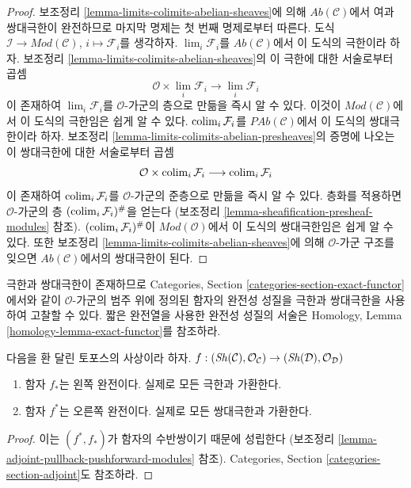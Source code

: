 \begin{proof}
보조정리 \ref{lemma-limits-colimits-abelian-sheaves}에 의해
$\textit{Ab}(\mathcal{C})$에서 여과 쌍대극한이 완전하므로 마지막 명제는
첫 번째 명제로부터 따른다. 도식
$\mathcal{I} \to \textit{Mod}(\mathcal{C})$, $i \mapsto \mathcal{F}_i$를
생각하자. $\lim_i \mathcal{F}_i$를 $\textit{Ab}(\mathcal{C})$에서 이
도식의 극한이라 하자. 보조정리
\ref{lemma-limits-colimits-abelian-sheaves}의 이 극한에 대한 서술로부터
곱셈
$$
\mathcal{O} \times \lim_i \mathcal{F}_i
\longrightarrow
\lim_i \mathcal{F}_i
$$
이 존재하여 $\lim_i \mathcal{F}_i$를 $\mathcal{O}$-가군의 층으로
만듦을 즉시 알 수 있다. 이것이 $\textit{Mod}(\mathcal{C})$에서 이
도식의 극한임은 쉽게 알 수 있다. $\mathop{\mathrm{colim}}\nolimits_i \mathcal{F}_i$를
$\textit{PAb}(\mathcal{C})$에서 이 도식의 쌍대극한이라 하자.
보조정리 \ref{lemma-limits-colimits-abelian-presheaves}의 증명에 나오는
이 쌍대극한에 대한 서술로부터 곱셈
$$
\mathcal{O} \times \mathop{\mathrm{colim}}\nolimits_i \mathcal{F}_i
\longrightarrow
\mathop{\mathrm{colim}}\nolimits_i \mathcal{F}_i
$$
이 존재하여 $\mathop{\mathrm{colim}}\nolimits_i \mathcal{F}_i$를 $\mathcal{O}$-가군의 준층으로
만듦을 즉시 알 수 있다. 층화를 적용하면 $\mathcal{O}$-가군의 층
$(\mathop{\mathrm{colim}}\nolimits_i \mathcal{F}_i)^\#$을 얻는다
(보조정리 \ref{lemma-sheafification-presheaf-modules} 참조).
$(\mathop{\mathrm{colim}}\nolimits_i \mathcal{F}_i)^\#$이 $\textit{Mod}(\mathcal{O})$에서 이
도식의 쌍대극한임은 쉽게 알 수 있다. 또한 보조정리
\ref{lemma-limits-colimits-abelian-sheaves}에 의해
$\mathcal{O}$-가군 구조를 잊으면 $\textit{Ab}(\mathcal{C})$에서의
쌍대극한이 된다.
\end{proof}

\noindent
극한과 쌍대극한이 존재하므로 Categories, Section
\ref{categories-section-exact-functor}에서와 같이 $\mathcal{O}$-가군의
범주 위에 정의된 함자의 완전성 성질을 극한과 쌍대극한을 사용하여
고찰할 수 있다. 짧은 완전열을 사용한 완전성 성질의 서술은
Homology, Lemma \ref{homology-lemma-exact-functor}를 참조하라.

\begin{lemma}
\label{lemma-exactness-pushforward-pullback}
다음을 환 달린 토포스의 사상이라 하자.
$f : (\mathop{\mathit{Sh}}\nolimits(\mathcal{C}), \mathcal{O}_\mathcal{C})
\to (\mathop{\mathit{Sh}}\nolimits(\mathcal{D}), \mathcal{O}_\mathcal{D})$
\begin{enumerate}
\item 함자 $f_*$는 왼쪽 완전이다. 실제로 모든 극한과 가환한다.
\item 함자 $f^*$는 오른쪽 완전이다. 실제로 모든 쌍대극한과 가환한다.
\end{enumerate}
\end{lemma}

\begin{proof}
이는 $(f^*, f_*)$가 함자의 수반쌍이기 때문에 성립한다
(보조정리 \ref{lemma-adjoint-pullback-pushforward-modules} 참조).
Categories, Section \ref{categories-section-adjoint}도 참조하라.
\end{proof}

